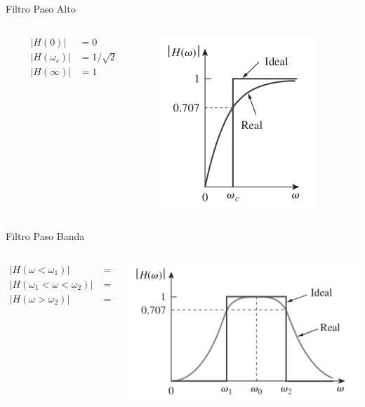 \documentclass[aspectratio=169, usenames,svgnames,dvipsnames]{beamer}
\begin{document}
\begin{frame}[label={sec:orgb8baa29}]{Filtro Paso Alto}
\begin{columns}
\begin{column}{0.3\columnwidth}
\begin{align*}
  |H(0)| &= 0\\
  |H(\omega_c)| &= 1/\sqrt{2}\\
  |H(\infty)| &= 1
\end{align*}
\end{column}

\begin{column}{0.7\columnwidth}
\begin{center}
\includegraphics[height=0.7\textheight]{../figs/Filtro_PasoAlto.pdf}
\end{center}
\end{column}
\end{columns}
\end{frame}

\begin{frame}[label={sec:org3ac663b}]{Filtro Paso Banda}
\begin{columns}
\begin{column}{0.3\columnwidth}
\begin{align*}
  |H(\omega < \omega_1)| &= 0\\
  |H(\omega_1 < \omega < \omega_2)| &= 1\\
  |H(\omega > \omega_2)| &= 0
\end{align*}
\end{column}

\begin{column}{0.7\columnwidth}
\begin{center}
\includegraphics[height=0.7\textheight]{../figs/Filtro_PasoBanda.pdf}
\end{center}
\end{column}
\end{columns}
\end{frame}
\end{document}
